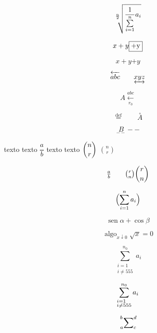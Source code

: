 \documentclass{report}
\DeclareMathOperator{\sen}{sen}
\DeclareMathOperator*{\algo}{algo}
\theoremstyle{remark}%
\begin{document}


$$
\sqrt[\uproot{6}\leftroot{3}\frac{n}{2}]{\frac{1}{\sum\limits_{i=1}^n}a_i}
$$


$$
x+y\fbox{+y}%
$$

$$
x+y\boxed{+y}%
$$

$$
\overleftarrow{abc}\qquad\underleftrightarrow{xyz}
$$

$$
A\xleftarrow[r_0]{abc}
$$


$$
\overset{\mathrm{def}}{=}\qquad\overset{\circ}{A}
$$%

$$
\underset{--}{B}--
$$%

texto texto $\dfrac{a}{b}$ texto texto $\dbinom{n}{r}$ $\binom{n}{r}$

$$
\tfrac{a}{b}\qquad\tbinom{r}{n}\binom{r}{n}
$$


$$
\Bigl(\sum_{i=1}^{n}a_i\Bigr)%
$$


$$%
\sen\alpha+\cos\beta%
$$

$$
\algo_{x\downarrow0}\sqrt{x}=0%
$$%


$$
\sum_{\substack{i=1\\i\neq555}}^{n_0}a_i%
$$%


$$
\sum_{\begin{subarray}{l}
i=1\\i\neq555
\end{subarray}}^{n_0}a_i
$$

$$
\sideset{_a^b}{_c^d}\sum%
$$
\end{document}
